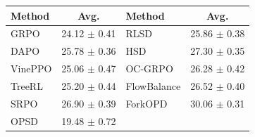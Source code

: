 \setlength{\tabcolsep}{4pt}
\begin{tabular}{lc@{\hspace{14pt}}lc}
\toprule
Method & Avg. & Method & Avg. \\
\midrule
GRPO & 24.12 $\pm$ 0.41 & RLSD & 25.86 $\pm$ 0.38 \\
DAPO & 25.78 $\pm$ 0.36 & HSD & 27.30 $\pm$ 0.35 \\
VinePPO & 25.06 $\pm$ 0.47 & OC-GRPO & 26.28 $\pm$ 0.42 \\
TreeRL & 25.20 $\pm$ 0.44 & FlowBalance & 26.52 $\pm$ 0.40 \\
SRPO & 26.90 $\pm$ 0.39 & ForkOPD & 30.06 $\pm$ 0.31 \\
OPSD & 19.48 $\pm$ 0.72 &  &  \\
\bottomrule
\end{tabular}
